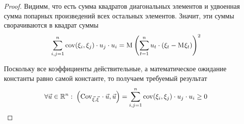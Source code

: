 \begin{enumerate}
\begin{proof}
            Видимм, что есть сумма квадратов диагональных элементов
            и удвоенная сумма попарных произведений всех остальных элементов.
            Значит, эти суммы сворачиваются в квадрат суммы
            $$\sum_{i,j=1}^{n} \mathrm{cov}\!\left( \xi_i, \xi_j \right) \cdot u_j \cdot u_i
                = \mathrm{M}_{} \left( \sum_{t=1}^{n} u_t
                    \cdot \left( \xi_t - \mathrm{M}_{} \xi_t \right) \right)^2$$

            Поскольку все коэффициенты действительные, а математическое
            ожидание константы равно самой константе, то получаем требуемый
            результат
            $$\forall \vec{u} \in \mathbb{R}^n:\;
                \left( \mathrm{Cov}_{\vec{\xi}, \vec{\xi}}\, \cdot \vec{u}, \vec{u} \right)
                = \sum_{i,j=1}^{n} \mathrm{cov}\!\left( \xi_i, \xi_j \right) \cdot u_j \cdot u_i
                \ge 0$$
        \end{proof}
\end{enumerate}
